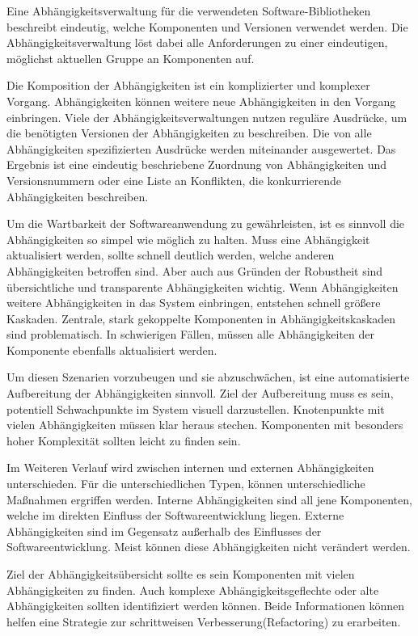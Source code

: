 Eine Abhängigkeitsverwaltung für die verwendeten Software-Bibliotheken beschreibt eindeutig, welche Komponenten und Versionen verwendet werden. Die Abhängigkeitsverwaltung löst dabei alle Anforderungen zu einer eindeutigen, möglichst aktuellen Gruppe an Komponenten auf. 

Die Komposition der Abhängigkeiten ist ein komplizierter und komplexer Vorgang. Abhängigkeiten können weitere neue Abhängigkeiten in den Vorgang einbringen. Viele der Abhängigkeitsverwaltungen nutzen reguläre Ausdrücke, um die benötigten Versionen der Abhängigkeiten zu beschreiben. Die von alle Abhängigkeiten spezifizierten Ausdrücke werden miteinander ausgewertet. Das Ergebnis ist eine eindeutig beschriebene Zuordnung von Abhängigkeiten und Versionsnummern oder eine Liste an Konflikten, die konkurrierende Abhängigkeiten beschreiben.

Um die Wartbarkeit der Softwareanwendung zu gewährleisten, ist es sinnvoll die Abhängigkeiten so simpel wie möglich zu halten. Muss eine Abhängigkeit aktualisiert werden, sollte schnell deutlich werden, welche anderen Abhängigkeiten betroffen sind.
Aber auch aus Gründen der Robustheit sind übersichtliche und transparente Abhängigkeiten wichtig. Wenn Abhängigkeiten weitere Abhängigkeiten in das System einbringen, entstehen schnell größere Kaskaden. Zentrale, stark gekoppelte Komponenten in Abhängigkeitskaskaden sind problematisch. In schwierigen Fällen, müssen alle Abhängigkeiten der Komponente ebenfalls aktualisiert werden.

Um diesen Szenarien vorzubeugen und sie abzuschwächen, ist eine automatisierte Aufbereitung der Abhängigkeiten sinnvoll. Ziel der Aufbereitung muss es sein, potentiell Schwachpunkte im System visuell darzustellen. Knotenpunkte mit vielen Abhängigkeiten müssen klar heraus stechen. Komponenten mit besonders hoher Komplexität sollten leicht zu finden sein.

Im Weiteren Verlauf wird zwischen internen und externen Abhängigkeiten unterschieden. Für die unterschiedlichen Typen, können unterschiedliche Maßnahmen ergriffen werden. Interne Abhängigkeiten sind all jene Komponenten, welche im direkten Einfluss der Softwareentwicklung liegen. Externe Abhängigkeiten sind im Gegensatz außerhalb des Einflusses der Softwareentwicklung. Meist können diese Abhängigkeiten nicht verändert werden.

Ziel der Abhängigkeitsübersicht sollte es sein Komponenten mit vielen Abhängigkeiten zu finden. Auch komplexe Abhängigkeitsgeflechte oder alte Abhängigkeiten sollten identifiziert werden können. Beide Informationen können helfen eine Strategie zur schrittweisen Verbesserung(\gls{Refactoring}) zu erarbeiten.

